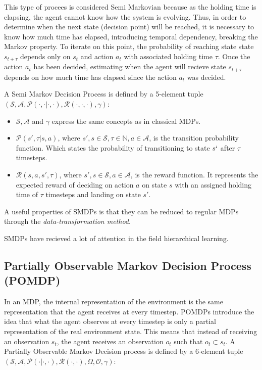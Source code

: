 \documentclass{../main.tex}{subfile}
\begin{document}
This type of procees is considered Semi Markovian because as the holding time is elapsing, the agent cannot know how the system is evolving. Thus, in order to determine when the next state (decision point) will be reached, it is necessary to know how much time has elapsed, introducing temporal dependency, breaking the Markov property. To iterate on this point, the probability of reaching state state $s_{t+\tau}$ depends only on $s_t$ and action $a_t$ with associated holding time $\tau$. Once the action $a_t$ has been decided, estimating when the agent will recieve state $s_{t+\tau}$ depends on how much time has elapsed since the action $a_t$ was decided.

A Semi Markov Decision Process is defined by a 5-element tuple $(\mathcal{S}, \mathcal{A}, \mathcal{P}(\cdot, \cdot | \cdot, \cdot), \mathcal{R}(\cdot, \cdot, \cdot), \gamma)$:
\begin{itemize}
    \item $\mathcal{S}, \mathcal{A}$ and $\gamma$ express the same concepts as in classical MDPs.
    \item $\mathcal{P}(s', \tau | s, a)$, where $s',s \in \mathcal{S}, \tau \in \mathbb{N}, a \in \mathcal{A}$, is the transition probability function. Which states the probability of transitioning to state $s`$ after $\tau$ timesteps.
    \item $\mathcal{R}(s, a, s', \tau)$, where $s',s \in \mathcal{S}, a \in \mathcal{A}$, is the reward function. It represents the expected reward of deciding on action $a$ on state $s$ with an assigned holding time of $\tau$ timesteps and landing on state $s'$.
\end{itemize}


A useful properties of SMDPs is that they can be reduced to regular MDPs through the \textit{data-transformation method}\citep{Piunovskiy2012}.

SMDPs have recieved a lot of attention in the field hierarchical learning.
\subsection{Partially Observable Markov Decision Process (POMDP)}
In an MDP, the internal representation of the environment is the same representation that the agent receives at every timestep. POMDPs introduce the idea that what the agent observes at every timestep is only a partial representation of the real environment state. This means that instead of receiving an observation $s_t$, the agent receives an observation $o_t$ such that $o_t \subset s_t$. A Partially Observable Markov Decision process is defined by a 6-element tuple $(\mathcal{S}, \mathcal{A}, \mathcal{P}(\cdot | \cdot, \cdot), \mathcal{R}(\cdot, \cdot), \Omega, \mathcal{O}, \gamma)$:
\end{document}
